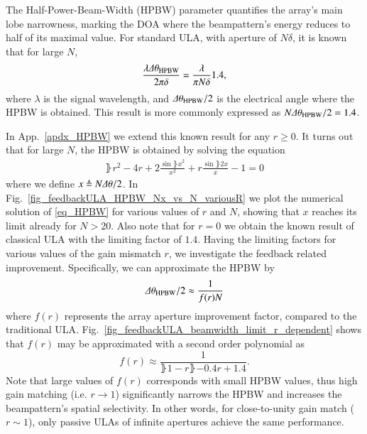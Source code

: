 The Half-Power-Beam-Width (HPBW) parameter quantifies the array's main lobe narrowness, marking the DOA where the beampattern's energy reduces to half of its maximal value.
For standard ULA, with aperture of $N\delta$, it is known \cite{van2004optimum} that for large $N$,
$$
 \frac{\lambda\Delta\theta_{\text{HPBW}}}{2\pi{}\delta} = \frac{\lambda}{\pi{}N\delta}1.4,
$$
where $\lambda$ is the signal wavelength, and $\Delta\theta_{\text{HPBW}}/2$ is the electrical angle where the HPBW is obtained. This result is more commonly expressed as $N\Delta\theta_{\text{HPBW}}/2= 1.4$. 
\par In App.~\ref{apdx_HPBW} we extend this known result for any $r\geq 0$. It turns out that for large $N$, the HPBW is obtained by solving the equation
\begin{equation}\label{eq_HPBW}
        \begin{split}
            \rBrace{r^{2}-4r+2}\frac{\sin{\rBrace{x}}^{2}}{x^{2}}+r\frac{\sin{\rBrace{2x}}}{x}-1=0
        \end{split}
\end{equation}
where we define $x\triangleq{} N\Delta\theta/2$. In Fig.~\ref{fig_feedbackULA_HPBW_Nx_vs_N_variousR} we plot the numerical solution of \eqref{eq_HPBW} for various values of $r$ and $N$, showing that $x$ reaches its limit already for $N>20$. Also note that for $r=0$ we obtain the known result of classical ULA with the limiting factor of $1.4$.
Having the limiting factors for various values of the gain mismatch $r$, we investigate the feedback related improvement.
Specifically, we can approximate the HPBW by
\[
\Delta\theta_{\text{HPBW}}/2\approx \frac{1}{f(r)N}
\]
where $f(r)$ represents the array aperture improvement factor, compared to the traditional ULA. 
Fig.~\ref{fig_feedbackULA_beamwidth_limit_r_dependent} shows that $f(r)$ may be approximated with a second order polynomial as
\begin{equation}
    \label{eq_Bapprox}
    f(r)\approx\frac{1}{\rBrace{1-r}\rBrace{-0.4r+1.4}}.
\end{equation}
Note that large values of $f(r)$ corresponds with small HPBW values, thus high gain matching (i.e. $r\to1$) significantly narrows the HPBW and increases the beampattern's spatial selectivity. 
In other words, for close-to-unity gain match ($r\sim1$), only passive ULAs of infinite apertures achieve the same performance.
